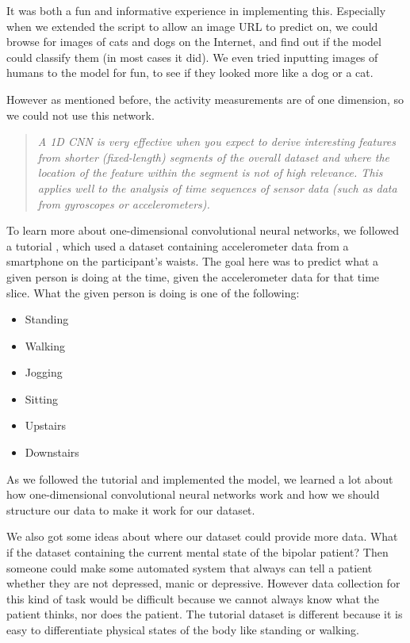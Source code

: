 It was both a fun and informative experience in implementing this. Especially when we extended the script to allow an image URL to predict on, we could browse for images of cats and dogs on the Internet, and find out if the model could classify them (in most cases it did). We even tried inputting images of humans to the model for fun, to see if they looked more like a dog or a cat.

However as mentioned before, the activity measurements are of one dimension, so we could not use this network.

\begin{quote}
  \textit{A 1D CNN is very effective when you expect to derive interesting features from shorter (fixed-length) segments of the overall dataset and where the location of the feature within the segment is not of high relevance. This applies well to the analysis of time sequences of sensor data (such as data from gyroscopes or accelerometers).} \cite{1d_cnn}
\end{quote}

To learn more about one-dimensional convolutional neural networks, we followed a tutorial \cite{1d_cnn}, which used a dataset containing accelerometer data from a smartphone on the participant's waists. The goal here was to predict what a given person is doing at the time, given the accelerometer data for that time slice. What the given person is doing is one of the following:

\begin{itemize}
  \item Standing
  \item Walking
  \item Jogging
  \item Sitting
  \item Upstairs
  \item Downstairs
\end{itemize}

As we followed the tutorial and implemented the model, we learned a lot about how one-dimensional convolutional neural networks work and how we should structure our data to make it work for our dataset.

We also got some ideas about where our dataset could provide more data. What if the dataset containing the current mental state of the bipolar patient? Then someone could make some automated system that always can tell a patient whether they are not depressed, manic or depressive. However data collection for this kind of task would be difficult because we cannot always know what the patient thinks, nor does the patient. The tutorial dataset is different because it is easy to differentiate physical states of the body like standing or walking.

